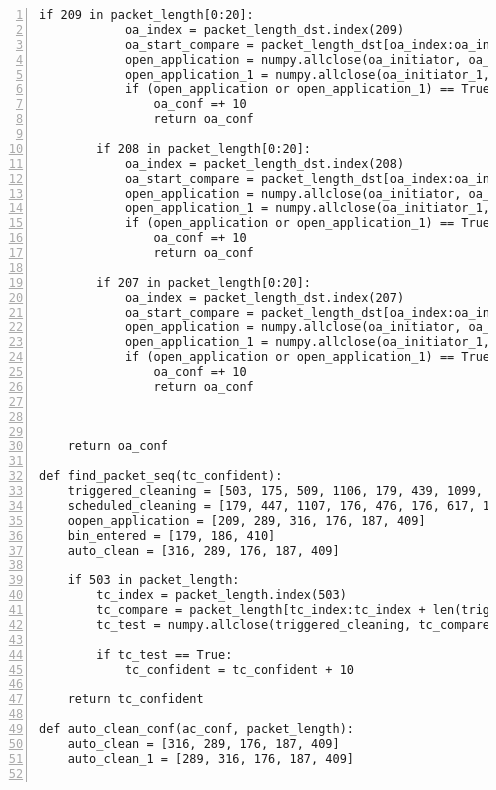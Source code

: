 \begin{lstlisting}[numbers=left]
        if 209 in packet_length[0:20]:
            oa_index = packet_length_dst.index(209)
            oa_start_compare = packet_length_dst[oa_index:oa_index + len(oa_initiator)]
            open_application = numpy.allclose(oa_initiator, oa_start_compare, atol= 3)
            open_application_1 = numpy.allclose(oa_initiator_1, oa_start_compare, atol= 3)
            if (open_application or open_application_1) == True:
                oa_conf =+ 10
                return oa_conf

        if 208 in packet_length[0:20]:
            oa_index = packet_length_dst.index(208)
            oa_start_compare = packet_length_dst[oa_index:oa_index + len(oa_initiator)]
            open_application = numpy.allclose(oa_initiator, oa_start_compare, atol= 3)
            open_application_1 = numpy.allclose(oa_initiator_1, oa_start_compare, atol= 3)
            if (open_application or open_application_1) == True:
                oa_conf =+ 10
                return oa_conf

        if 207 in packet_length[0:20]:
            oa_index = packet_length_dst.index(207)
            oa_start_compare = packet_length_dst[oa_index:oa_index + len(oa_initiator)]
            open_application = numpy.allclose(oa_initiator, oa_start_compare, atol= 3)
            open_application_1 = numpy.allclose(oa_initiator_1, oa_start_compare, atol= 3)
            if (open_application or open_application_1) == True:
                oa_conf =+ 10
                return oa_conf

    
    
    return oa_conf

def find_packet_seq(tc_confident):
    triggered_cleaning = [503, 175, 509, 1106, 179, 439, 1099, 179, 445, 1105, 176]
    scheduled_cleaning = [179, 447, 1107, 176, 476, 176, 617, 179, 253, 626, 179, 447, 1107]
    oopen_application = [209, 289, 316, 176, 187, 409]
    bin_entered = [179, 186, 410]
    auto_clean = [316, 289, 176, 187, 409]
    
    if 503 in packet_length:
        tc_index = packet_length.index(503)
        tc_compare = packet_length[tc_index:tc_index + len(triggered_cleaning) ]
        tc_test = numpy.allclose(triggered_cleaning, tc_compare, atol= 1)

        if tc_test == True:
            tc_confident = tc_confident + 10

    return tc_confident

def auto_clean_conf(ac_conf, packet_length):
    auto_clean = [316, 289, 176, 187, 409]
    auto_clean_1 = [289, 316, 176, 187, 409]


\end{lstlisting}
